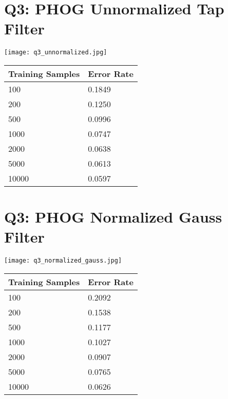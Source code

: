 \documentclass[12pt]{article}
\begin{document}
\newpage
\section*{Q3: PHOG Unnormalized Tap Filter}
  \texttt{[image: q3\_unnormalized.jpg]}
  \begin{tabular}{l|l}
    \hline
    Training Samples & Error Rate \\
    \hline
    100   & 0.1849 \\
    200   & 0.1250 \\
    500   & 0.0996 \\
    1000  & 0.0747 \\
    2000  & 0.0638 \\
    5000  & 0.0613 \\
    10000 & 0.0597 \\
  \end{tabular}

\newpage
\section*{Q3: PHOG Normalized Gauss Filter}
  \texttt{[image: q3\_normalized\_gauss.jpg]}
  \begin{tabular}{l|l}
    \hline
    Training Samples & Error Rate \\
    \hline
    100   & 0.2092 \\
    200   & 0.1538 \\
    500   & 0.1177 \\
    1000  & 0.1027 \\
    2000  & 0.0907 \\
    5000  & 0.0765 \\
    10000 & 0.0626 \\
  \end{tabular}
\end{document}
